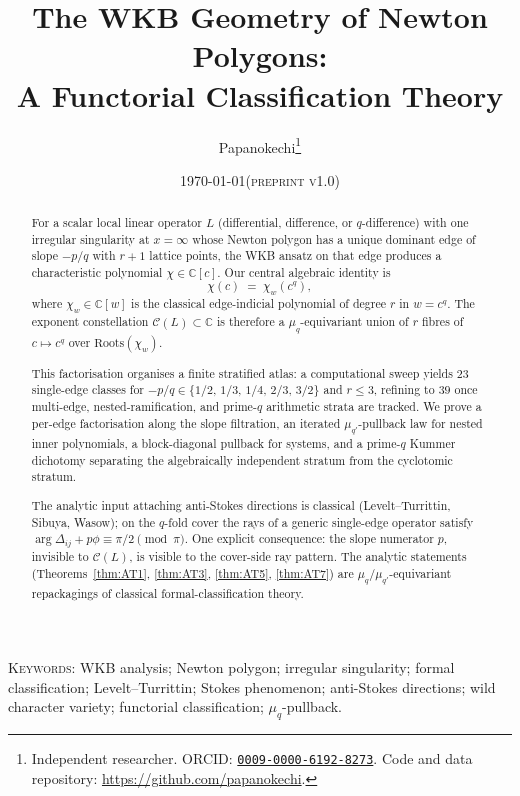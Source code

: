 \documentclass[11pt,a4paper]{article}
\title{The WKB Geometry of Newton Polygons:\\
       A Functorial Classification Theory}
\author{%
  Papanokechi\thanks{Independent researcher. ORCID:
  \href{https://orcid.org/0009-0000-6192-8273}{\texttt{0009-0000-6192-8273}}.
  Code and data repository:
  \url{https://github.com/papanokechi}.}
}
\date{\today\hspace{1ex}\textsc{(preprint v1.0)}}
\theoremstyle{plain}
\theoremstyle{definition}
\theoremstyle{remark}
\newcommand{\Roots}{\mathrm{Roots}}
\newcommand{\Cl}{\mathcal{C}}
\newcommand{\Dij}{\Delta_{ij}}
\begin{document}
\maketitle

\begin{abstract}
For a scalar local linear operator $L$ (differential, difference, or
$q$-difference) with one irregular singularity at $x = \infty$ whose
Newton polygon has a unique dominant edge of slope $-p/q$ with $r{+}1$
lattice points, the WKB ansatz on that edge produces a characteristic
polynomial $\chi \in \mathbb{C}[c]$. Our central algebraic identity is
\[
   \chi(c) \;=\; \chi_w(c^q),
\]
where $\chi_w \in \mathbb{C}[w]$ is the classical edge-indicial polynomial
of degree $r$ in $w = c^q$. The exponent constellation
$\Cl(L) \subset \mathbb{C}$ is therefore a $\mu_q$-equivariant union of
$r$ fibres of $c \mapsto c^q$ over $\Roots(\chi_w)$.

This factorisation organises a finite stratified atlas: a computational
sweep yields $23$ single-edge classes for
$-p/q \in \{1/2,\,1/3,\,1/4,\,2/3,\,3/2\}$ and $r \le 3$, refining to
$39$ once multi-edge, nested-ramification, and prime-$q$ arithmetic
strata are tracked. We prove a per-edge factorisation along the slope
filtration, an iterated $\mu_{q'}$-pullback law for nested inner
polynomials, a block-diagonal pullback for systems, and a prime-$q$
Kummer dichotomy separating the algebraically independent stratum from
the cyclotomic stratum.

The analytic input attaching anti-Stokes directions is classical
(Levelt--Turrittin, Sibuya, Wasow); on the $q$-fold cover the rays of a
generic single-edge operator satisfy
$\arg \Dij + p\phi \equiv \pi/2 \pmod{\pi}$. One explicit consequence:
the slope numerator $p$, invisible to $\Cl(L)$, is visible to the
cover-side ray pattern. The analytic statements
(Theorems~\ref{thm:AT1}, \ref{thm:AT3}, \ref{thm:AT5}, \ref{thm:AT7})
are $\mu_q/\mu_{q'}$-equivariant repackagings of classical
formal-classification theory.
\end{abstract}

\bigskip
\noindent\textsc{Keywords:} WKB analysis; Newton polygon; irregular
singularity; formal classification; Levelt--Turrittin; Stokes phenomenon;
anti-Stokes directions; wild character variety; functorial classification;
$\mu_q$-pullback.
\end{document}
